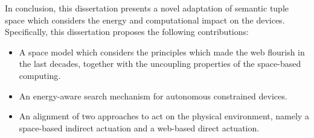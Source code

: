 \begin{laburpena}
In conclusion, this dissertation presents a novel adaptation of semantic tuple space which considers the energy and computational impact on the devices.
Specifically, this dissertation proposes the following contributions:
\begin{itemize}
  \item A space model which considers the principles which made the web flourish in the last decades, together with the uncoupling properties of the space-based computing.
  \item An energy-aware search mechanism for autonomous constrained devices.
  \item An alignment of two approaches to act on the physical environment, namely a space-based indirect actuation and a web-based direct actuation.
\end{itemize}
\end{laburpena}



